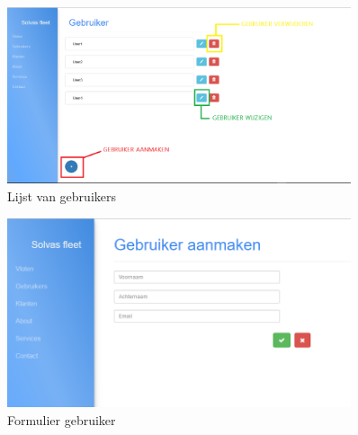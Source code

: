 \documentclass[11pt,openany]{article}
\begin{document}
\begin{figure}
	\centering
	\includegraphics[width=0.9\textwidth]{fig2.png}
	\caption{Lijst van gebruikers}
\end{figure}
	
\begin{figure}
	\centering
	\includegraphics[width=0.9\textwidth]{fig3.png}
	\caption{Formulier gebruiker}
\end{figure}

\newpage
\end{document}

